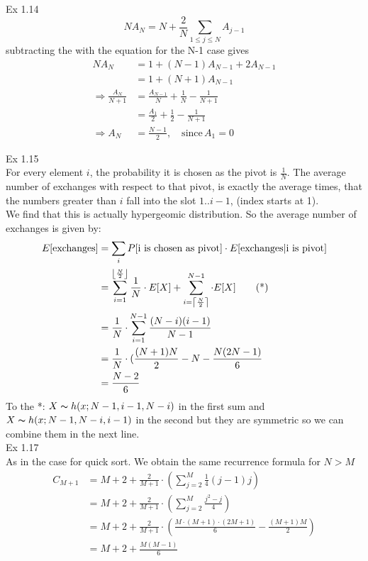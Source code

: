 \documentclass{article}
\DeclarePairedDelimiter\ceil{\lceil}{\rceil}
\DeclarePairedDelimiter\floor{\lfloor}{\rfloor}
\begin{document}
  

Ex 1.14 \\
\[
	N A_N = N + \frac{2}{N}\sum_{1 \leq j \leq N}A_{j-1}
\]
subtracting the with the equation for the N-1 case gives
\begin{align*}
	N A_N &= 1 + (N - 1) A_{N-1} + 2A_{N-1} \\
		&= 1 + (N+1) A_{N-1} \\
	\Rightarrow \frac{A_N}{N+1} &= \frac{A_{N-1}}{N} + \frac{1}{N} - \frac{1}{N+1} \\
	&= \frac{A_1}{2} + \frac{1}{2} - \frac{1}{N+1} \\
	\Rightarrow A_N
	&= \frac{N-1}{2},\quad \text{since} \, A_1 = 0
\end{align*}

Ex 1.15\\
For every element $i$, the probability it is chosen as the pivot is $\frac{1}{N}$. The average number of exchanges with respect to that pivot, is exactly the average times, that the numbers greater than $i$ fall into the slot $1..i-1$, (index starts at 1). \\
We find that this is actually hypergeomic distribution. So the average number of exchanges is given by:
\begin{align*}
	E[\text{exchanges}] &= \sum_{i} P[\text{i is chosen as pivot}] \cdot E[\text{exchanges}| \text{i is pivot}] \\
	&= \sum_{i=1}^{\floor*{\frac{N}{2}}} \frac{1}{N} \cdot E[X] + \sum_{i = \ceil*{\frac{N}{2}}}^{N-1} \cdot E[X] \tag{*}\\
	&= \frac{1}{N}\cdot\sum_{i = 1}^{N-1} \frac{(N-i)(i-1)}{N-1} \\
	&= \frac{1}{N} \cdot (\frac{(N+1)N}{2} - N - \frac{N(2N-1)}{6}\\
	&= \frac{N-2}{6}
\end{align*}
To the *: $X \thicksim h(x;N-1,i-1,N-i)$ in the first sum and \\$X \thicksim h(x;N-1, N-i,i-1)$ in the second but they are symmetric so we can combine them in the next line.\\
Ex 1.17 \\
As in the case for quick sort. We obtain the same recurrence formula for 
$N > M$
\begin{align*}
	C_{M+1} &= M + 2 + \frac{2}{M+1}\cdot(\sum_{j = 2}^{M}\frac{1}{4}(j-1)j) \\
		    &= M + 2 + \frac{2}{M + 1} \cdot (\sum_{j = 2}^{M} \frac{j^2-j}{4}) \\
		    &= M + 2 + \frac{2}{M+1} \cdot (\frac{M\cdot(M+1)\cdot(2M+1)}{6} - \frac{(M+1)M}{2}) \\
		    &= M + 2 + \frac{M(M-1)}{6}
\end{align*}
\end{document}
